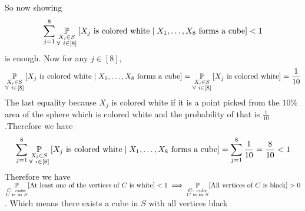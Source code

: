 \documentclass[a4paper, 11pt]{article}
\begin{document}
{So now showing $$ \sum_{j=1}^8\underset{\substack{X_i\in S\\ \forall\ i\in[8]}}{\mathbb{P}}\left[X_j\text{ is colored white}\mid   X_1,\dots,X_8 \text{ forms a cube}\right]<1$$ is enough. Now for any $j\in[8]$, $$\underset{\substack{X_i\in S\\ \forall\ i\in[8]}}{\bbP}\lt[X_j\text{ is colored white}\mid   X_1,\dots,X_8 \text{ forms a cube}\rt]=\underset{\substack{X_i\in S\\ \forall\ i\in[8]}}{\bbP}\lt[X_j\text{ is colored white}\rt]=\frac{1}{10}$$The last equality because $X_j$ is colored white if it is a point picked from the $10\%$ area of the sphere which is colored white and the probability of that is $\frac1{10}$.Therefore we have $$\sum_{j=1}^8\underset{\substack{X_i\in S\\ \forall\ i\in[8]}}{\mathbb{P}}\left[X_j\text{ is colored white}\mid   X_1,\dots,X_8 \text{ forms a cube}\right]=\sum_{j=1}^8\frac1{10}=\frac{8}{10}<1$$Therefore we have $\underset{\substack{C:\ cube\\ C\text{ is in $S$}}}{\mathbb{P}}[\text{At least one of the vertices of $C$ is white}]<1\implies \underset{\substack{C:\ cube\\ C\text{ is in $S$}}}{\mathbb{P}}[\text{All vertices of $C$ is black}]>0$. Which means there exists a cube in $S$ with all vertices black
 }
\end{document}
